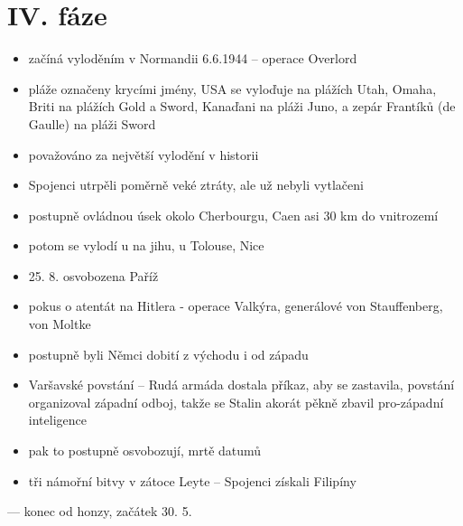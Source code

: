 \documentclass{article}
\begin{document}
\section{IV. fáze}
\begin{itemize}
  \item začíná vyloděním v Normandii 6.6.1944 -- operace Overlord
  \item pláže označeny krycími jmény, USA se vyloďuje na plážích Utah, Omaha, Briti na plážích Gold a Sword, Kanaďani na pláži Juno, a zepár Frantíků (de Gaulle) na pláži Sword
  \item považováno za největší vylodění v historii
  \item Spojenci utrpěli poměrně veké ztráty, ale už nebyli vytlačeni
  \item postupně ovládnou úsek okolo Cherbourgu, Caen asi 30 km do vnitrozemí
  \item potom se vylodí u na jihu, u Tolouse, Nice
  \item 25. 8. osvobozena Paříž
  \item pokus o atentát na Hitlera - operace Valkýra, generálové von Stauffenberg, von Moltke
  \item postupně byli Němci dobití z východu i od západu
  \item Varšavské povstání -- Rudá armáda dostala příkaz, aby se zastavila, povstání organizoval západní odboj, takže se Stalin akorát pěkně zbavil pro-západní inteligence
  \item pak to postupně osvobozují, mrtě datumů
  \item tři námořní bitvy v zátoce Leyte -- Spojenci získali Filipíny
\end{itemize}

--- konec od honzy, začátek 30. 5.
\end{document}
